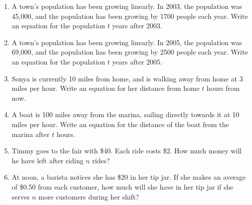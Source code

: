 \begin{enumerate}

\item A town's population has been growing linearly. In 2003, the population was 45,000, and the population has been growing by 1700 people each year. Write an equation for the population $t$ years after 2003.

\item A town's population has been growing linearly. In 2005, the population was 69,000, and the population has been growing by 2500 people each year. Write an equation for the population $t$ years after 2005.

\item Sonya is currently 10 miles from home, and is walking away from home at 3 miles per hour. Write an equation for her distance from home $t$ hours from now.

\item A boat is 100 miles away from the marina, sailing directly towards it at 10 miles per hour. Write an equation for the distance of the boat from the marina after $t$ hours.

\item Timmy goes to the fair with \$40. Each ride costs \$2. How much money will he have left after riding $n$ rides?

\item At noon, a barista notices she has \$20 in her tip jar. If she makes an average of \$0.50 from each customer, how much will she have in her tip jar if she serves $n$ more customers during her shift?



\end{enumerate}
